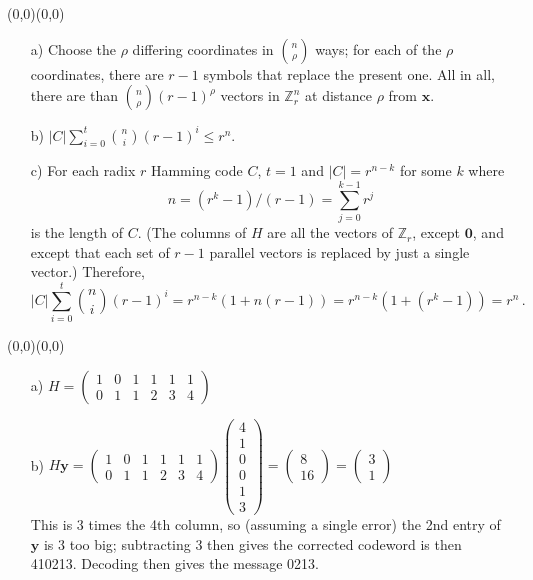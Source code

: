 \documentclass[11pt]{article}
\newcommand{\ds}{\displaystyle}
\renewcommand{\vec}[1]{\mathbf{#1}}
\newcommand{\vc}[1]{\begin{pmatrix}#1\end{pmatrix}}
\newcommand{\upabit}{\begin{picture}(0,0)(0,0)\end{picture}\vspace*{-5mm}}
\begin{document}
\bigskip
{}\upabit
\begin{itemize}
  \item[{a)}] Choose the $\rho$ differing coordinates in $\binom{n}{\rho}$ ways;
              for each of the $\rho$ coordinates,
              there are $r-1$ symbols that replace the present one.
              All in all, there are than $\binom{n}{\rho}(r-1)^\rho$ vectors in $\mathbb{Z}_r^n$
              at distance $\rho$ from $\vec{x}$.
  \item[{b)}] $\ds|C|\sum_{i=0}^t \binom{n}{i}(r-1)^i \leq r^n$.
  \item[{c)}] For each radix $r$ Hamming code $C$, $t=1$ and $|C| = r^{n-k}$ for some $k$
              where
              \[
                n  = (r^k - 1)/(r-1) = \sum_{j=0}^{k-1} r^j
              \]
              is the length of $C$.
              (The columns of $H$ are all the vectors of $\mathbb{Z}_r$, except $\vec{0}$,
              and except that each set of $r-1$ parallel vectors is replaced by just a single vector.)
              Therefore,
              \[
                  |C|\sum_{i=0}^t \binom{n}{i}(r-1)^i
                = r^{n-k} (1 + n(r-1))
                = r^{n-k} (1 + (r^k-1))
                = r^n\,.
              \]
\end{itemize}

\bigskip
{}\upabit
\begin{itemize}
  \item[{a)}] $H = \vc{1 & 0 & 1 & 1 & 1 & 1\\
                       0 & 1 & 1 & 2 & 3 & 4}$
  \item[{b)}] $H\vec{y} = \vc{1 & 0 & 1 & 1 & 1 & 1\\
                              0 & 1 & 1 & 2 & 3 & 4}
                          \vc{4\\ 1\\ 0\\ 0\\ 1\\ 3}
                        = \vc{8\\16}
                        = \vc{3\\1}$
            \\This is 3 times the 4th column, so (assuming a single error)
            the 2nd entry of $\vec{y}$ is 3 too big;
            subtracting 3 then gives the corrected codeword is then 410213.
            Decoding then gives the message 0213.
\end{itemize}
\end{document}
